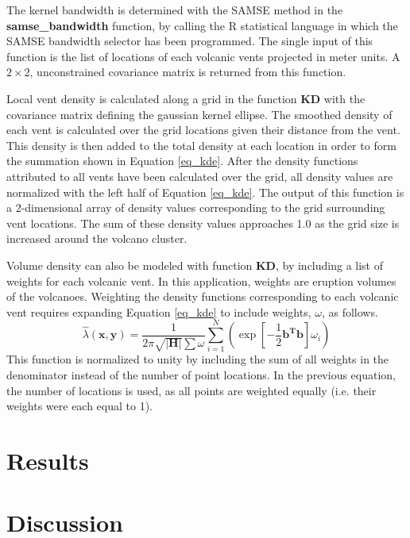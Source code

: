 \documentclass[12pt,letter]{article}
\begin{document}
The kernel bandwidth is determined with the SAMSE method in the \textbf{samse\_bandwidth} function, by calling the R statistical language in which the SAMSE bandwidth selector has been programmed. The single input of this function is the list of locations of each volcanic vents projected in meter units. A $2\times 2$, unconstrained covariance matrix is returned from this function.

Local vent density is calculated along a grid in the function \textbf{KD} with the covariance matrix defining the gaussian kernel ellipse. The smoothed density of each vent is calculated over the grid locations given their distance from the vent. This density is then added to the total density at each location in order to form the summation shown in Equation \ref{eq_kde}. After the density functions attributed to all vents have been calculated over the grid, all density values are normalized with the left half of Equation \ref{eq_kde}. The output of this function is a 2-dimensional array of density values corresponding to the grid surrounding vent locations. The sum of these density values approaches 1.0 as the grid size is increased around the volcano cluster.

Volume density can also be modeled with function \textbf{KD}, by including a list of weights for each volcanic vent. In this application, weights are eruption volumes of the volcanoes. Weighting the density functions corresponding to each volcanic vent requires expanding Equation \ref{eq_kde} to include weights, $\omega$, as follows.
\begin{equation}
\hat{\lambda}(\mathbf{x,y})=\frac{1}{2\pi\sqrt{|\mathbf{H}|}\sum{\omega}}\sum\limits_{i=1}^{N}\left(\exp\left[-\frac{1}{2}\mathbf{b^Tb}\right]\omega_i\right)
\label{eq_weigthedkde}
\end{equation}
This function is normalized to unity by including the sum of all weights in the denominator instead of the number of point locations. In the previous equation, the number of locations is used, as all points are weighted equally (i.e. their weights were each equal to 1).

\section{Results}

\section{Discussion}
\end{document}
